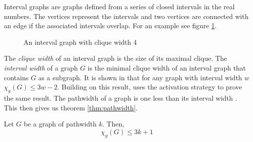 Interval graphs are graphs defined from a series of closed intervals in the real numbers. The vertices represent the intervals and two vertices are connected with an edge if the associated intervals overlap. For an example see figure \ref{fig:intvGraph}.
%
\begin{figure}[h]
    \centering
    \caption{An interval graph with clique width 4}
    \label{fig:intvGraph}
\end{figure}
%
The \textit{clique width} of an interval graph is the size of its maximal clique. The \textit{interval width} of a graph $G$ is the minimal clique width of an interval graph that contains $G$ as a subgraph. It is shown in \cite{faKeKiTr1993} that for any graph with interval width $w$ $\chi_g(G)\leq 3w - 2$. Building on this result, \cite{KIERSTEAD2000} uses the activation strategy to prove the same result. The pathwidth of a graph is one less than its interval width \cite{Bodlaender1998}. This then gives us theorem \ref{thm:pathwidth}. 

\begin{theorem}\label{thm:pathwidth}
    Let $G$ be a graph of pathwidth $k$. Then, 
    \[\chi_g(G) \leq 3k + 1\]    
\end{theorem}

